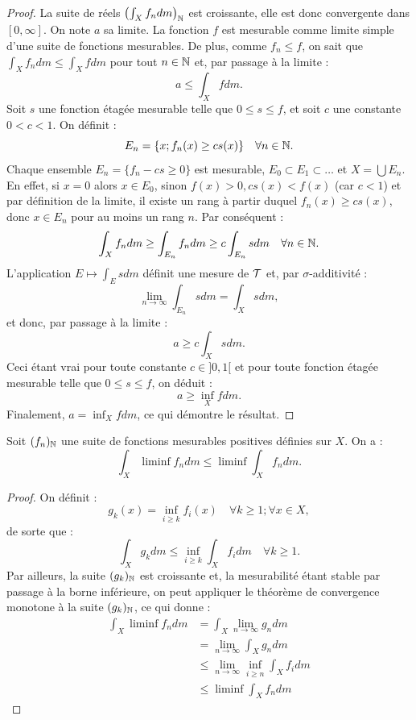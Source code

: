 \begin{proof}
La suite de réels $\left( \int_X f_n dm \right)_{\mathbb{N}}$ est croissante, elle est donc convergente dans $[0, \infty]$. 
On note $a$ sa limite. La fonction $f$ est mesurable comme limite simple d'une suite de fonctions mesurables.
De plus, comme $f_n \leq f$, on sait que $\int_X f_n dm \leq \int_X f dm$ pour tout $n \in \mathbb{N}$ et, par passage à la limite :
\[ a \leq \int_X f dm . \]
Soit $s$ une fonction étagée mesurable telle que $0 \leq s \leq f$, et soit $c$ une constante $0<c<1$. On définit :
\[ E_n = \{ x ; f_n(x) \geq cs(x)  \} \quad \forall n \in \mathbb{N} . \]
Chaque ensemble $E_n = \{ f_n - cs \geq 0 \}$ est mesurable, $E_0 \subset E_1 \subset \dots$ et $X = \bigcup E_n$.
En effet, si $x=0$ alors $x \in E_0$, sinon $f(x) >0, cs(x) < f(x)$ (car $c<1$) et par définition de la limite, il existe un rang à partir duquel
$f_n(x) \geq cs(x)$, donc $x \in E_n$ pour au moins un rang $n$. Par conséquent :
\[ \int_X f_n dm \geq \int_{E_n} f_n dm \geq c \int_{E_n} s dm \quad \forall n \in \mathbb{N} . \]
L'application $E \mapsto \int_{E} s dm$ définit une mesure de $\mathcal{T}$ et, par $\sigma$-additivité :
\[ \lim_{n \to \infty} \int_{E_n} s dm = \int_X s dm , \]
et donc, par passage à la limite :
\[ a \geq c \int_X s dm . \]
Ceci étant vrai pour toute constante $c \in ]0,1[$ et pour toute fonction étagée mesurable telle que $0 \leq s \leq f$, on déduit :
\[ a \geq \inf_X f dm . \]
Finalement, $a = \inf_X f dm$, ce qui démontre le résultat.
\end{proof}

\begin{lem}[de Fatou]
Soit $(f_n)_{\mathbb{N}}$ une suite de fonctions mesurables positives définies sur $X$. On a :
\[ \int_X \liminf f_n dm \leq \liminf \int_X f_n dm . \] 
\end{lem}

\begin{proof}
On définit :
\[ g_k(x) = \inf_{i \geq k} f_i(x) \quad \forall k \geq 1 ; \forall x \in X , \]
de sorte que :
\[ \int_X g_k dm \leq \inf_{i \geq k} \int_X f_i dm \quad \forall k \geq 1 . \]
Par ailleurs, la suite $(g_k)_{\mathbb{N}}$ est croissante et, la mesurabilité étant stable par passage à la borne inférieure, on peut appliquer 
le théorème de convergence monotone à la suite $(g_k)_{\mathbb{N}}$, ce qui donne :
\begin{align*}
\int_X \liminf f_n dm & = \int_X \lim_{n \to \infty} g_n dm \\
& = \lim_{n \to \infty} \int_X g_n dm \\
& \leq \lim_{n \to \infty} \inf_{i \geq n} \int_X f_i dm \\
& \leq \liminf \int_X f_n dm
\end{align*}
\end{proof}

